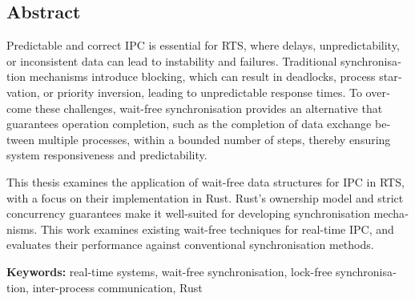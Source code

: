 \begin{otherlanguage}{english}
\chapter*{Abstract}


Predictable and correct \ac{IPC} is essential for \ac{RTS}, where delays, unpredictability, or inconsistent data can lead to instability and failures. Traditional synchronisation mechanisms introduce blocking, which can result in deadlocks, process starvation, or priority inversion, leading to unpredictable response times. To overcome these challenges, wait-free synchronisation provides an alternative that guarantees operation completion, such as the completion of data exchange between multiple processes, within a bounded number of steps, thereby ensuring system responsiveness and predictability.

This thesis examines the application of wait-free data structures for \ac{IPC} in \ac{RTS}, with a focus on their implementation in Rust. Rust's ownership model and strict concurrency guarantees make it well-suited for developing synchronisation mechanisms. This work examines existing wait-free techniques for real-time \ac{IPC}, and evaluates their performance against conventional synchronisation methods.

\vfill
\noindent\textbf{Keywords:} real-time systems, wait-free synchronisation, lock-free synchronisation, inter-process communication, Rust
\vfill
\end{otherlanguage}
